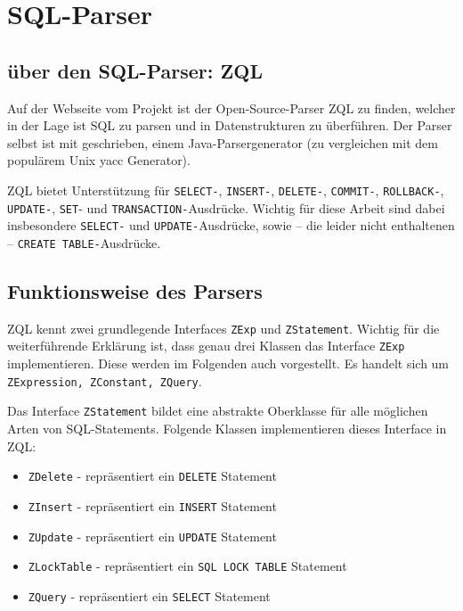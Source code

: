 \section{SQL-Parser}

\subsection{über den SQL-Parser: ZQL}

	Auf der Webseite vom \cite{zql1} Projekt ist der Open-Source-Parser ZQL zu finden, welcher in der Lage ist SQL zu parsen und in Datenstrukturen zu überführen. Der Parser selbst ist mit \cite{javacc1} geschrieben, einem  Java-Parsergenerator (zu vergleichen mit dem populärem Unix yacc Generator).

ZQL bietet Unterstützung für \verb|SELECT-|, \verb|INSERT-|, \verb|DELETE-|, \verb|COMMIT-|, \verb|ROLLBACK-|, \verb|UPDATE-|, \verb|SET|- und \verb|TRANSACTION-|Ausdrücke. Wichtig für diese Arbeit sind dabei insbesondere \verb|SELECT-| und \verb|UPDATE-|Ausdrücke, sowie -- die leider nicht enthaltenen -- \verb|CREATE TABLE-|Ausdrücke.

\subsection{Funktionsweise des Parsers}
\label{subsec:funktionparser}

ZQL kennt zwei grundlegende Interfaces \verb|ZExp| und \verb|ZStatement|. Wichtig für die weiterführende Erklärung ist, dass genau drei Klassen das Interface \verb|ZExp| implementieren. Diese werden im Folgenden auch vorgestellt. Es handelt sich um \verb|ZExpression, ZConstant, ZQuery|.

Das Interface \verb|ZStatement| bildet eine abstrakte Oberklasse für alle möglichen Arten von SQL-Statements. Folgende Klassen implementieren dieses Interface in ZQL:

\begin{itemize}
\item \verb|ZDelete| - repräsentiert ein \verb|DELETE| Statement
\item \verb|ZInsert| - repräsentiert ein \verb|INSERT| Statement
\item \verb|ZUpdate| - repräsentiert ein \verb|UPDATE| Statement
\item \verb|ZLockTable| - repräsentiert ein \verb|SQL LOCK TABLE| Statement
\item \verb|ZQuery| - repräsentiert ein \verb|SELECT| Statement
\end{itemize}

